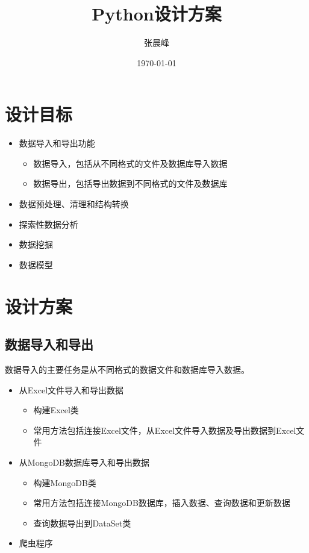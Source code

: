 \documentclass[UTF8,a4paper,10pt]{article}
\title{Python设计方案}
\author{张晨峰}
\date{\today}
\begin{document}
\maketitle

\section{设计目标}
\begin{itemize}
  \item 数据导入和导出功能
  \begin{itemize}
    \item 数据导入，包括从不同格式的文件及数据库导入数据
    \item 数据导出，包括导出数据到不同格式的文件及数据库
  \end{itemize}
  \item 数据预处理、清理和结构转换
  \item 探索性数据分析
  \item 数据挖掘
  \item 数据模型
\end{itemize}

\section{设计方案}
\subsection{数据导入和导出}

数据导入的主要任务是从不同格式的数据文件和数据库导入数据。

\begin{itemize}
  \item 从Excel文件导入和导出数据
  \begin{itemize}
    \item 构建Excel类
    \item 常用方法包括连接Excel文件，从Excel文件导入数据及导出数据到Excel文件
  \end{itemize}
  \item 从MongoDB数据库导入和导出数据
  \begin{itemize}
    \item 构建MongoDB类
    \item 常用方法包括连接MongoDB数据库，插入数据、查询数据和更新数据
    \item 查询数据导出到DataSet类
  \end{itemize}
  \item 爬虫程序
\end{itemize}
\end{document}
